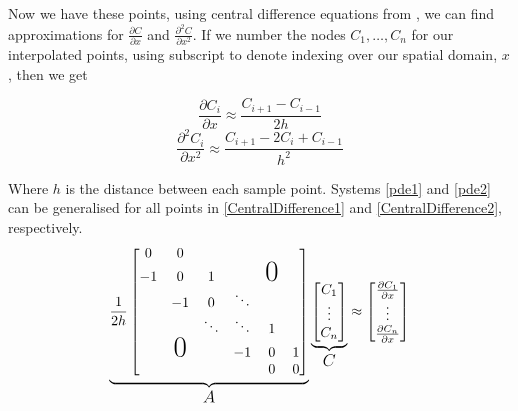\documentclass{article}
\begin{document}
Now we have these points, using central difference equations from \cite{numanal}, we can find approximations for $\frac{\partial C}{\partial x}$ and $\frac{\partial^2 C}{\partial x^2}$. If we number the nodes $C_1, \ldots , C_n$ for our interpolated points, using subscript to denote indexing over our spatial domain, $x$, then we get

\begin{equation} \label{pde1}
    \frac{\partial C_i}{\partial x} \approx \frac{C_{i+1} - C_{i-1}}{2h}
\end{equation}
\begin{equation} \label{pde2}
    \frac{\partial^2 C_i}{\partial x^2} \approx \frac{C_{i+1} -2C_i + C_{i-1}}{h^2}
\end{equation}

Where $h$ is the distance between each sample point. Systems \eqref{pde1} and \eqref{pde2} can be generalised for all points in \eqref{CentralDifference1} and \eqref{CentralDifference2}, respectively.
\begin{equation} \label{CentralDifference1}
        \underbrace{\frac{1}{2h}
        \begin{bmatrix}
        0 & 0 &  & & \\
        -1 & 0 & 1 & &\text{\huge{$0$}} & \\
         & -1 & 0 & \ddots &\\
         & & \ddots & \ddots & 1 \\
         & \text{\huge{$0$}} & & -1 & 0 & 1 \\
         & & & & 0 & 0
        \end{bmatrix}}_\text{\large{$A$}}
        \underbrace{\begin{bmatrix}
            C_1 \\ \vdots \\ C_n
        \end{bmatrix}}_\text{\large{$C$}}
        \approx
        \begin{bmatrix}
            \frac{\partial C_1}{\partial x} \\ \vdots \\ \frac{\partial C_n}{\partial x}
        \end{bmatrix}
\end{equation}
\end{document}
